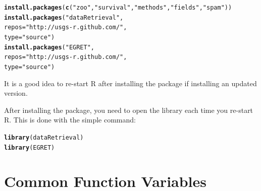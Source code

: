 \documentclass[a4paper,11pt]{article}\usepackage{graphicx, color}
\makeatletter
\newcommand{\hlfunctioncall}[1]{\textcolor[rgb]{0.501960784313725,0,0.329411764705882}{\textbf{#1}}}%
\newcommand{\hlstring}[1]{\textcolor[rgb]{0.6,0.6,1}{#1}}%
\newenvironment{kframe}{%
 \def\at@end@of@kframe{}%
 \ifinner\ifhmode%
  \def\at@end@of@kframe{\end{minipage}}%
  \begin{minipage}{\columnwidth}%
 \fi\fi%
 \def\FrameCommand##1{\hskip\@totalleftmargin \hskip-\fboxsep
 \colorbox{shadecolor}{##1}\hskip-\fboxsep
     \hskip-\linewidth \hskip-\@totalleftmargin \hskip\columnwidth}%
 \MakeFramed {\advance\hsize-\width
   \@totalleftmargin\z@ \linewidth\hsize
   \@setminipage}}%
 {\par\unskip\endMakeFramed%
 \at@end@of@kframe}
\newenvironment{knitrout}{}{} %
\makeatother
\begin{document}
\begin{knitrout}
\color{fgcolor}\begin{kframe}
\begin{alltt}
\hlfunctioncall{install.packages}(\hlfunctioncall{c}(\hlstring{"zoo"},\hlstring{"survival"},\hlstring{"methods"},\hlstring{"fields"},\hlstring{"spam"}))
\hlfunctioncall{install.packages}(\hlstring{"dataRetrieval"}, 
                 repos=\hlstring{"http://usgs-r.github.com/"}, 
                 type=\hlstring{"source"})
\hlfunctioncall{install.packages}(\hlstring{"EGRET"}, 
                 repos=\hlstring{"http://usgs-r.github.com/"}, 
                 type=\hlstring{"source"})
\end{alltt}
\end{kframe}
\end{knitrout}


It is a good idea to re-start R after installing the package if installing an updated version. 

After installing the package, you need to open the library each time you re-start R.  This is done with the simple command:
\begin{knitrout}
\color{fgcolor}\begin{kframe}
\begin{alltt}
\hlfunctioncall{library}(dataRetrieval)
\hlfunctioncall{library}(EGRET)
\end{alltt}
\end{kframe}
\end{knitrout}


\newpage
\FloatBarrier
\section{Common Function Variables}
\label{sec:appendixPlot}
\end{document}
